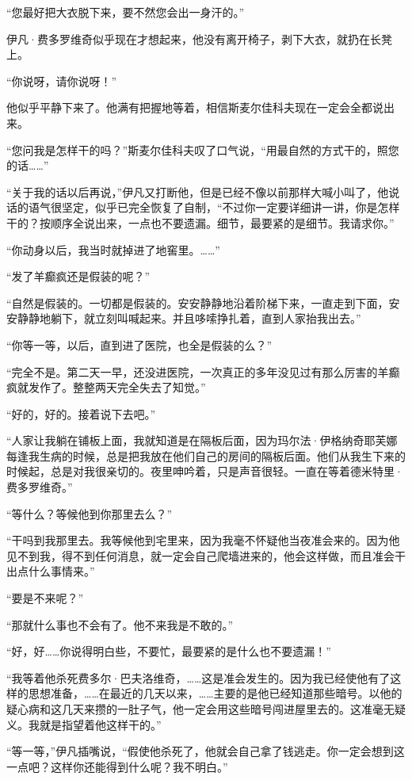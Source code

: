 \par “您最好把大衣脱下来，要不然您会出一身汗的。”
\par 伊凡·费多罗维奇似乎现在才想起来，他没有离开椅子，剥下大衣，就扔在长凳上。
\par “你说呀，请你说呀！”
\par 他似乎平静下来了。他满有把握地等着，相信斯麦尔佳科夫现在一定会全都说出来。
\par “您问我是怎样干的吗？”斯麦尔佳科夫叹了口气说，“用最自然的方式干的，照您的话……”
\par “关于我的话以后再说，”伊凡又打断他，但是已经不像以前那样大喊小叫了，他说话的语气很坚定，似乎已完全恢复了自制，“不过你一定要详细讲一讲，你是怎样干的？按顺序全说出来，一点也不要遗漏。细节，最要紧的是细节。我请求你。”
\par “你动身以后，我当时就掉进了地窖里。……”
\par “发了羊癫疯还是假装的呢？”
\par “自然是假装的。一切都是假装的。安安静静地沿着阶梯下来，一直走到下面，安安静静地躺下，就立刻叫喊起来。并且哆嗦挣扎着，直到人家抬我出去。”
\par “你等一等，以后，直到进了医院，也全是假装的么？”
\par “完全不是。第二天一早，还没进医院，一次真正的多年没见过有那么厉害的羊癫疯就发作了。整整两天完全失去了知觉。”
\par “好的，好的。接着说下去吧。”
\par “人家让我躺在铺板上面，我就知道是在隔板后面，因为玛尔法·伊格纳奇耶芙娜每逢我生病的时候，总是把我放在他们自己的房间的隔板后面。他们从我生下来的时候起，总是对我很亲切的。夜里呻吟着，只是声音很轻。一直在等着德米特里·费多罗维奇。”
\par “等什么？等候他到你那里去么？”
\par “干吗到我那里去。我等候他到宅里来，因为我毫不怀疑他当夜准会来的。因为他见不到我，得不到任何消息，就一定会自己爬墙进来的，他会这样做，而且准会干出点什么事情来。”
\par “要是不来呢？”
\par “那就什么事也不会有了。他不来我是不敢的。”
\par “好，好……你说得明白些，不要忙，最要紧的是什么也不要遗漏！”
\par “我等着他杀死费多尔·巴夫洛维奇，……这是准会发生的。因为我已经使他有了这样的思想准备，……在最近的几天以来，……主要的是他已经知道那些暗号。以他的疑心病和这几天来攒的一肚子气，他一定会用这些暗号闯进屋里去的。这准毫无疑义。我就是指望着他这样干的。”
\par “等一等，”伊凡插嘴说，“假使他杀死了，他就会自己拿了钱逃走。你一定会想到这一点吧？这样你还能得到什么呢？我不明白。”
